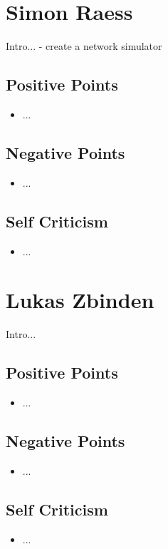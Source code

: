 \newpage
\section{Simon Raess}
Intro...
- create a network simulator
\subsection{Positive Points}
\begin{itemize}
\item ...
\end{itemize}

\subsection{Negative Points}
\begin{itemize}
\item ...
\end{itemize}

\subsection{Self Criticism}
\begin{itemize}
\item ...
\end{itemize}


\newpage
\section{Lukas Zbinden}
Intro...
\subsection{Positive Points}
\begin{itemize}
\item ...
\end{itemize}

\subsection{Negative Points}
\begin{itemize}
\item ...
\end{itemize}

\subsection{Self Criticism}
\begin{itemize}
\item ...
\end{itemize}
